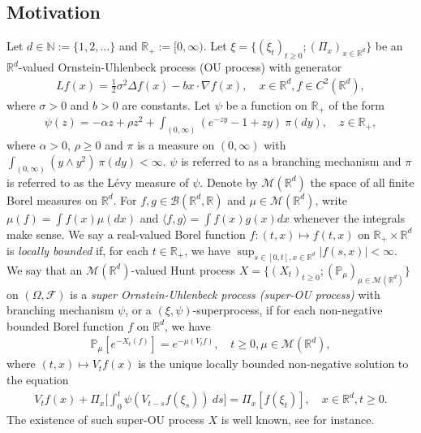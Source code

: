 \documentclass[EJP]{ejpecp} %
\begin{document}
\subsection{Motivation}
\label{subsec:M}
Let $d \in \mathbb N:= \{1,2,\dots\}$ and $\mathbb R_+:= [0,\infty)$.
Let $\xi=\{(\xi_t)_{t\geq 0}; (\Pi_x)_{x\in \mathbb R^d}\}$ be an $\mathbb R^d$-valued Ornstein-Uhlenbeck process (OU process) with generator
\begin{align}
  Lf(x)
  = \frac{1}{2}\sigma^2\Delta f(x)-b x \cdot \nabla f(x)
  , \quad  x\in \mathbb R^d, f \in C^2(\mathbb R^d),
\end{align}
where $\sigma > 0$ and $b > 0$ are constants.
Let $\psi$ be a function on $\mathbb R_+$ of the form
\begin{align}
  \label{eq: honogeneou branching mechanism}
  \psi(z)
  =- \alpha z + \rho z^2 + \int_{(0,\infty)} (e^{-zy} - 1 + zy)~\pi(dy)
  , \quad  z \in \mathbb R_+,
\end{align}
where $\alpha > 0 $, $\rho \geq0$ and $\pi$ is a measure on $(0,\infty)$ with $\int_{(0,\infty)}(y\wedge y^2)~\pi(dy)< \infty$.
$\psi$ is referred to as a branching mechanism and $\pi$ is referred to as the L\'evy measure of $\psi$.
Denote by $\mathcal M(\mathbb R^d)$ the space of all finite Borel measures on $\mathbb R^d$.
For $f,g\in \mathcal B(\mathbb R^d, \mathbb R)$ and $\mu \in \mathcal M(\mathbb R^d)$,
 write $\mu(f)= \int f(x)\mu(dx)$
and $\langle f, g\rangle = \int f(x)g(x) dx$ whenever the integrals make sense.
We say a real-valued Borel function $f:(t,x)\mapsto f(t,x)$ on $\mathbb R_+\times \mathbb R^d$ is \emph{locally bounded} if, for each $t\in \mathbb R_+$, we have $ \sup_{s\in [0,t],x\in \mathbb R^d} |f(s,x)|<\infty. $
We say that an $\mathcal M(\mathbb R^d)$-valued Hunt process $X = \{(X_t)_{t\geq 0}; (\mathbb{P}_{\mu})_{\mu \in \mathcal M(\mathbb R^d)}\}$
on  $(\Omega, \mathscr{F})$
is a \emph{super Ornstein-Uhlenbeck process (super-OU process)} with branching mechanism $\psi$, or a $(\xi, \psi)$-superprocess, if for each non-negative bounded Borel function $f$ on $\mathbb R^d$, we have
\begin{align}
  \label{eq: def of V_t}
  \mathbb{P}_{\mu}[e^{-X_t(f)}]
  = e^{-\mu(V_tf)}
  , \quad t\geq 0, \mu \in \mathcal M(\mathbb R^d),
\end{align}
where $(t,x) \mapsto V_tf(x)$ is the unique locally bounded non-negative solution to the equation
\begin{align}
  V_tf(x) + \Pi_x \Big[ \int_0^t\psi (V_{t-s}f(\xi_s) )~ds\Big]
	= \Pi_x [f(\xi_t)]
  , \quad x\in \mathbb R^d, t\geq 0.
\end{align}	
The existence of such super-OU process $X$ is well known, see \cite{Dynkin1993Superprocesses} for instance.
\end{document}
